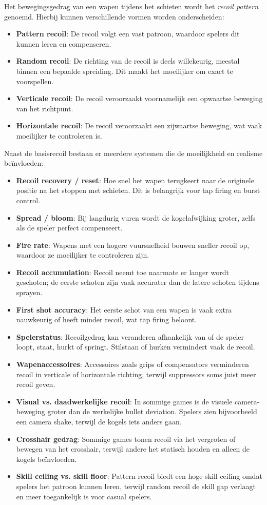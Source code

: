 Het bewegingsgedrag van een wapen tijdens het schieten wordt het \textit{recoil pattern} genoemd. Hierbij kunnen verschillende vormen worden onderscheiden:
\begin{itemize}
\item \textbf{Pattern recoil}: De recoil volgt een vast patroon, waardoor spelers dit kunnen leren en compenseren.
\item \textbf{Random recoil}: De richting van de recoil is deels willekeurig, meestal binnen een bepaalde spreiding. Dit maakt het moeilijker om exact te voorspellen.
\item \textbf{Verticale recoil}: De recoil veroorzaakt voornamelijk een opwaartse beweging van het richtpunt.
\item \textbf{Horizontale recoil}: De recoil veroorzaakt een zijwaartse beweging, wat vaak moeilijker te controleren is.
\end{itemize}

Naast de basisrecoil bestaan er meerdere systemen die de moeilijkheid en realisme beïnvloeden:
\begin{itemize}
\item \textbf{Recoil recovery / reset}: Hoe snel het wapen terugkeert naar de originele positie na het stoppen met schieten. Dit is belangrijk voor tap firing en burst control.
\item \textbf{Spread / bloom}: Bij langdurig vuren wordt de kogelafwijking groter, zelfs als de speler perfect compenseert.
\item \textbf{Fire rate}: Wapens met een hogere vuursnelheid bouwen sneller recoil op, waardoor ze moeilijker te controleren zijn.
\item \textbf{Recoil accumulation}: Recoil neemt toe naarmate er langer wordt geschoten; de eerste schoten zijn vaak accurater dan de latere schoten tijdens sprayen.
\item \textbf{First shot accuracy}: Het eerste schot van een wapen is vaak extra nauwkeurig of heeft minder recoil, wat tap firing beloont.
\item \textbf{Spelerstatus}: Recoilgedrag kan veranderen afhankelijk van of de speler loopt, staat, hurkt of springt. Stilstaan of hurken vermindert vaak de recoil.
\item \textbf{Wapenaccessoires}: Accessoires zoals grips of compensators verminderen recoil in verticale of horizontale richting, terwijl suppressors soms juist meer recoil geven.
\item \textbf{Visual vs. daadwerkelijke recoil}: In sommige games is de visuele camera-beweging groter dan de werkelijke bullet deviation. Spelers zien bijvoorbeeld een camera shake, terwijl de kogels iets anders gaan.
\item \textbf{Crosshair gedrag}: Sommige games tonen recoil via het vergroten of bewegen van het crosshair, terwijl andere het statisch houden en alleen de kogels beïnvloeden.
\item \textbf{Skill ceiling vs. skill floor}: Pattern recoil biedt een hoge skill ceiling omdat spelers het patroon kunnen leren, terwijl random recoil de skill gap verlaagt en meer toegankelijk is voor casual spelers.
\end{itemize}

